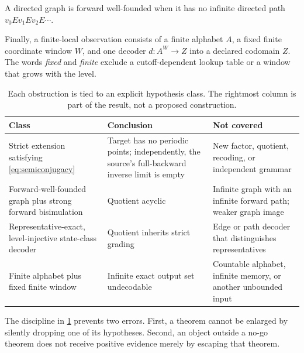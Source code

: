 \begin{definition}
\label{def:forward-well-founded}
A directed graph is forward well-founded when it has no infinite directed
path $v_0Ev_1Ev_2E\cdots$.
\end{definition}

Finally, a finite-local observation consists of a finite alphabet $A$, a
fixed finite coordinate window $W$, and one decoder $d:A^W\to Z$ into a
declared codomain $Z$.  The words \emph{fixed} and \emph{finite} exclude a
cutoff-dependent lookup table or a window that grows with the level.

\begin{table}[H]
\centering
\small
\caption{Each obstruction is tied to an explicit hypothesis class.  The
rightmost column is part of the result, not a proposed construction.}
\label{tab:scope}
\begin{tabularx}{\textwidth}{@{}>{\raggedright\arraybackslash}p{}
  >{\raggedright\arraybackslash}p{}
  >{\raggedright\arraybackslash}X@{}}
\toprule
Class & Conclusion & Not covered \\
\midrule
Strict extension satisfying \eqref{eq:semiconjugacy} &
Target has no periodic points; independently, the source's full-backward
inverse limit is empty &
New factor, quotient, recoding, or independent grammar \\
Forward-well-founded graph plus strong forward bisimulation &
Quotient acyclic &
Infinite graph with an infinite forward path; weaker graph image \\
Representative-exact, level-injective state-class decoder &
Quotient inherits strict grading &
Edge or path decoder that distinguishes representatives \\
Finite alphabet plus fixed finite window &
Infinite exact output set undecodable &
Countable alphabet, infinite memory, or another unbounded input \\
\bottomrule
\end{tabularx}
\end{table}

The discipline in \cref{tab:scope} prevents two errors.  First, a theorem
cannot be enlarged by silently dropping one of its hypotheses.  Second, an
object outside a no-go theorem does not receive positive evidence merely by
escaping that theorem.
